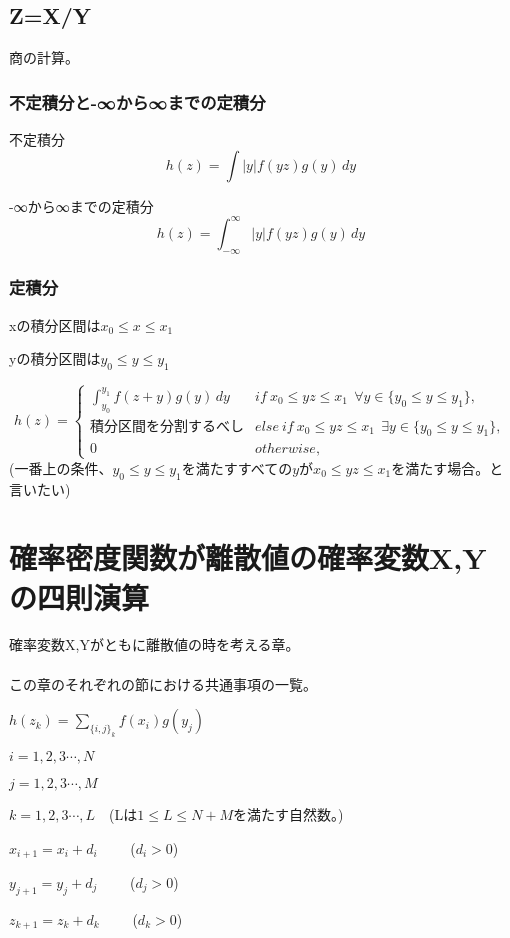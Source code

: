 \documentclass[a4paper,11pt]{ltjsarticle}
\begin{document}
\subsection{Z=X/Y}
商の計算。
\subsubsection{不定積分と-∞から∞までの定積分}
不定積分
$$
    h(z) = \int |y| f(yz) g(y)\,dy
$$

-∞から∞までの定積分
$$
    h(z) = \int_{-\infty}^{\infty} |y| f(yz) g(y)\,dy
$$
\subsubsection{定積分}
\begin{description}
    \item xの積分区間は$x_0 \leq x \leq x_1$
    \item yの積分区間は$y_0 \leq y \leq y_1$
\end{description}
$$
    h(z)=
    \begin{cases}
        \int_{y_0}^{y_1} f(z+y) g(y)\,dy    & if\ x_0 \leq yz \leq x_1 \ \ \forall y\in \{ y_0 \leq y \leq y_1\},\\
        積分区間を分割するべし                & else \ if\ x_0 \leq yz \leq x_1 \ \ \exists y\in \{ y_0 \leq y \leq y_1\}, \\
        0                                   & otherwise,
    \end{cases}
$$
(一番上の条件、$y_0 \leq y \leq y_1$を満たすすべての$y$が$x_0 \leq yz \leq x_1$を満たす場合。と言いたい)

\newpage


\section{確率密度関数が離散値の確率変数X,Yの四則演算}
確率変数X,Yがともに離散値の時を考える章。\\
\\

この章のそれぞれの節における共通事項の一覧。
\begin{description}
    \item $h(z_k) = \sum_{\{i,j\}_k} f(x_i) g(y_j)$
    \item $i=1,2,3\cdots,N$
    \item $j=1,2,3\cdots,M$
    \item $k=1,2,3\cdots,L$\ \ (Lは$1\leq L \leq N+M$を満たす自然数。)
    \item $x_{i+1}=x_i+d_i$ \ \ \ \ ($d_i>0$)
    \item $y_{j+1}=y_j+d_j$ \ \ \ \ ($d_j>0$)
    \item $z_{k+1}=z_k+d_k$ \ \ \ \ ($d_k>0$)
\end{description}
\end{document}

